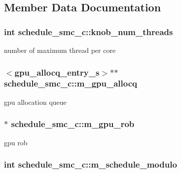 \subsection{Member Data Documentation}
\hypertarget{classschedule__smc__c_a615d15485be9b13e8f62ed984acc588e}{
\subsubsection[{knob\_\-num\_\-threads}]{\setlength{\rightskip}{0pt plus 5cm}int {\bf schedule\_\-smc\_\-c::knob\_\-num\_\-threads}}}
\label{classschedule__smc__c_a615d15485be9b13e8f62ed984acc588e}
number of maximum thread per core \hypertarget{classschedule__smc__c_a8862c810b1e0da537ef0a5b7b7e8e2b6}{
\subsubsection[{m\_\-gpu\_\-allocq}]{$<${\bf gpu\_\-allocq\_\-entry\_\-s}$>$$\ast$$\ast$ {\bf schedule\_\-smc\_\-c::m\_\-gpu\_\-allocq}}}
\label{classschedule__smc__c_a8862c810b1e0da537ef0a5b7b7e8e2b6}
gpu allocation queue \hypertarget{classschedule__smc__c_a9010fc8b51522f02c9742f7c9498805b}{
\subsubsection[{m\_\-gpu\_\-rob}]{$\ast$ {\bf schedule\_\-smc\_\-c::m\_\-gpu\_\-rob}}}
\label{classschedule__smc__c_a9010fc8b51522f02c9742f7c9498805b}
gpu rob \hypertarget{classschedule__smc__c_aeb0d028cbba234e9e93abede46bba2ca}{
\subsubsection[{m\_\-schedule\_\-modulo}]{\setlength{\rightskip}{0pt plus 5cm}int {\bf schedule\_\-smc\_\-c::m\_\-schedule\_\-modulo}}}
